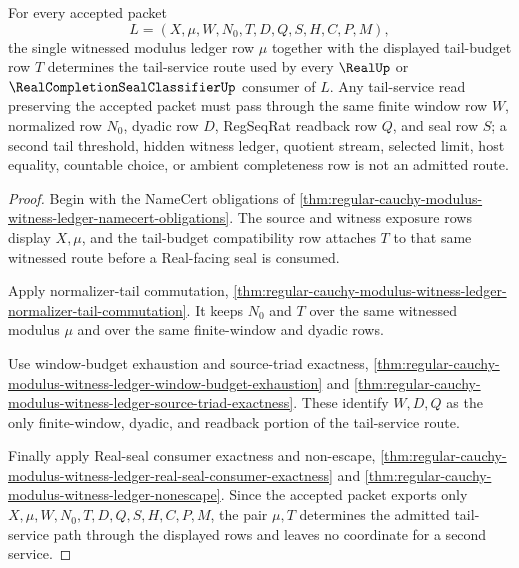 \begin{theorem}
\label{thm:regular-cauchy-modulus-witness-ledger-tail-service-uniqueness}
For every accepted packet
$$
L=(X,\mu,W,N_0,T,D,Q,S,H,C,P,M),
$$
the single witnessed modulus ledger row $\mu$ together with the displayed tail-budget row $T$ determines the tail-service route used by every $\RealUp$ or $\RealCompletionSealClassifierUp$ consumer of $L$. Any tail-service read preserving the accepted packet must pass through the same finite window row $W$, normalized row $N_0$, dyadic row $D$, RegSeqRat readback row $Q$, and seal row $S$; a second tail threshold, hidden witness ledger, quotient stream, selected limit, host equality, countable choice, or ambient completeness row is not an admitted route.
\end{theorem}
\begin{proof}
Begin with the NameCert obligations of \autoref{thm:regular-cauchy-modulus-witness-ledger-namecert-obligations}. The source and witness exposure rows display $X,\mu$, and the tail-budget compatibility row attaches $T$ to that same witnessed route before a Real-facing seal is consumed.

Apply normalizer-tail commutation, \autoref{thm:regular-cauchy-modulus-witness-ledger-normalizer-tail-commutation}. It keeps $N_0$ and $T$ over the same witnessed modulus $\mu$ and over the same finite-window and dyadic rows.

Use window-budget exhaustion and source-triad exactness, \autoref{thm:regular-cauchy-modulus-witness-ledger-window-budget-exhaustion} and \autoref{thm:regular-cauchy-modulus-witness-ledger-source-triad-exactness}. These identify $W,D,Q$ as the only finite-window, dyadic, and readback portion of the tail-service route.

Finally apply Real-seal consumer exactness and non-escape, \autoref{thm:regular-cauchy-modulus-witness-ledger-real-seal-consumer-exactness} and \autoref{thm:regular-cauchy-modulus-witness-ledger-nonescape}. Since the accepted packet exports only $X,\mu,W,N_0,T,D,Q,S,H,C,P,M$, the pair $\mu,T$ determines the admitted tail-service path through the displayed rows and leaves no coordinate for a second service.
\end{proof}

